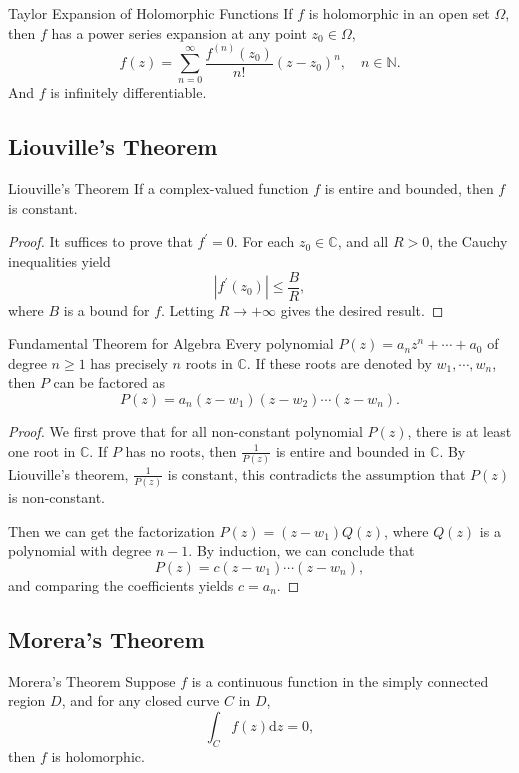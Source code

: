 \begin{theorem}{Taylor Expansion of Holomorphic Functions}{}
  If $f$ is holomorphic in an open set $\Omega$,
  then $f$ has a power series expansion at any point $z_0 \in \Omega$,
  \begin{equation}
    f(z) = \sum\limits_{n = 0}^{\infty} \frac{f^{(n)}(z_0)}{n!}(z-z_0)^n, \quad n \in \mathbb{N}.
  \end{equation}
   And $f$ is infinitely differentiable.
\end{theorem}

\subsection{Liouville's Theorem}

\begin{theorem}{Liouville's Theorem}{}
  If a complex-valued function $f$ is entire and bounded, then $f$ is constant.
\end{theorem}

\begin{proof}
  It suffices to prove that $f^{\prime} = 0$.
  For each $z_0 \in \mathbb{C}$, and all $R > 0$, the Cauchy inequalities yield
  \begin{equation}
    |f^{\prime}(z_0)| \leq \frac{B}{R},
  \end{equation}
  where $B$ is a bound for $f$. Letting $R \rightarrow +\infty$ gives the desired result.
\end{proof}

\begin{theorem}{Fundamental Theorem for Algebra}{}
  Every polynomial $P(z) = a_nz^n + \cdots + a_0$ of degree $n \geq 1$
  has precisely $n$ roots in $\mathbb{C}$.
  If these roots are denoted by $w_1,\cdots,w_n$, then $P$ can be factored as
  \begin{equation}
    P(z) = a_n(z-w_1)(z-w_2)\cdots (z-w_n).
  \end{equation}
\end{theorem}

\begin{proof}
  We first prove that for all non-constant polynomial $P(z)$,
  there is at least one root in $\mathbb{C}$.
  If $P$ has no roots, then $\frac{1}{P(z)}$ is entire and bounded in $\mathbb{C}$.
  By Liouville's theorem, $\frac{1}{P(z)}$ is constant,
  this contradicts the assumption that $P(z)$ is non-constant.

  Then we can get the factorization $P(z) = (z-w_1)Q(z)$,
  where $Q(z)$ is a polynomial with degree $n-1$.
  By induction, we can conclude that
  \begin{equation}
    P(z) = c(z-w_1)\cdots (z-w_n),
  \end{equation}
  and comparing the coefficients yields $c = a_n$.
\end{proof}


\subsection{Morera's Theorem}

\begin{theorem}{Morera's Theorem}{}
  Suppose $f$ is a continuous function in the simply connected region $D$,
  and for any closed curve $C$ in $D$,
  \begin{equation}
    \int_C f(z)\mathrm{d} z = 0,
  \end{equation}
  then $f$ is holomorphic.
\end{theorem}


